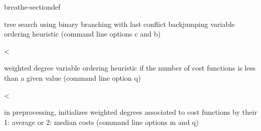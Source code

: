 \documentclass[letterpaper,10pt,openany,oneside,english]{sphinxmanual}
\begin{document}
\begin{fulllineitems}
\begin{sphinxuseclass}{breathe-sectiondef}
\begin{fulllineitems}
\sphinxAtStartPar
tree search using binary branching with last conflict backjumping variable ordering heuristic (command line options \sphinxhyphen{}c and \sphinxhyphen{}b) 

\end{fulllineitems}


\begin{fulllineitems}
\label{\detokenize{ref/ref_cpp:_CPPv4N8ToulBar217weightedTightnessE}}\label{\detokenize{ref/ref_cpp:_CPPv3N8ToulBar217weightedTightnessE}}\label{\detokenize{ref/ref_cpp:_CPPv2N8ToulBar217weightedTightnessE}}\label{\detokenize{ref/ref_cpp:ToulBar2::weightedTightness__i}}
\pysigstartsignatures
\pysigstartmultiline
{}
\pysigstopmultiline
\pysigstopsignatures
\sphinxAtStartPar
\textless{} 

\sphinxAtStartPar
weighted degree variable ordering heuristic if the number of cost functions is less than a given value (command line option \sphinxhyphen{}q) 

\end{fulllineitems}


\begin{fulllineitems}
\label{\detokenize{ref/ref_cpp:_CPPv4N8ToulBar214constrOrderingE}}\label{\detokenize{ref/ref_cpp:_CPPv3N8ToulBar214constrOrderingE}}\label{\detokenize{ref/ref_cpp:_CPPv2N8ToulBar214constrOrderingE}}\label{\detokenize{ref/ref_cpp:ToulBar2::constrOrdering__i}}
\pysigstartsignatures
\pysigstartmultiline
{}
\pysigstopmultiline
\pysigstopsignatures
\sphinxAtStartPar
\textless{} 

\sphinxAtStartPar
in preprocessing, initializes weighted degrees associated to cost functions by their 1: average or 2: median costs (command line options \sphinxhyphen{}m and \sphinxhyphen{}q) 


\end{fulllineitems}
\end{sphinxuseclass}
\end{fulllineitems}
\end{document}
